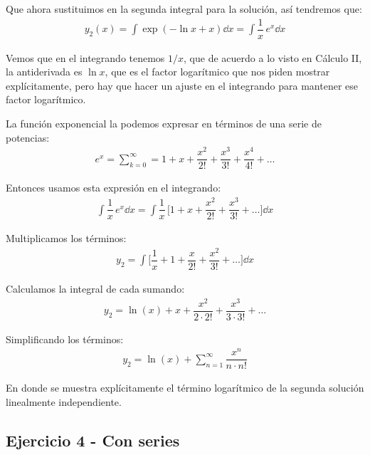 \begin{ejemplo}
Que ahora sustituimos en la segunda integral para la solución, así tendremos que:
\begin{align*}
y_{2} (x) = \int \exp(- \ln x + x ) \dd{x} =  \int \dfrac{1}{x} \, e^{x} \dd{x}
\end{align*}

Vemos que en el integrando tenemos $1/x$, que de acuerdo a lo visto en Cálculo II, la antiderivada es $\ln x$, que es el factor logarítmico que nos piden mostrar explícitamente, pero hay que hacer un ajuste en el integrando para mantener ese factor logarítmico.
\par
La función exponencial la podemos expresar en términos de una serie de potencias:
\begin{align*}
e^{x} = \sum_{k=0}^{\infty} =  1 + x + \dfrac{x^{2}}{2!} + \dfrac{x^{3}}{3!} + \dfrac{x^{4}}{4!} + \ldots
\end{align*}

Entonces usamos esta expresión en el integrando:
\begin{align*}
\int \dfrac{1}{x} \, e^{x} \dd{x} = \int \dfrac{1}{x} \, \bigg[ 1 + x + \dfrac{x^{2}}{2!} + \dfrac{x^{3}}{3!} + \ldots \bigg] \dd{x}
\end{align*}

Multiplicamos los términos:
\begin{align*}
y_{2} = \int \bigg[ \dfrac{1}{x} + 1 + \dfrac{x}{2!} + \dfrac{x^{2}}{3!} + \ldots \bigg] \dd{x}
\end{align*}

Calculamos la integral de cada sumando:
\begin{align*}
y_{2} =  \ln (x) + x + \dfrac{x^{2}}{2 \cdot 2!} + \dfrac{x^{3}}{3 \cdot 3!} + \ldots
\end{align*}

Simplificando los términos:
\begin{align*}
y_{2} =  \ln (x) + \sum_{n=1}^{\infty} \dfrac{x^{n}}{n \cdot n!}
\end{align*}

En donde se muestra explícitamente el término logarítmico de la segunda solución linealmente independiente.
\end{ejemplo}

\subsection{Ejercicio 4 - Con series}

